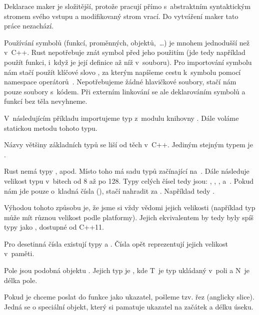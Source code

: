 \documentclass[main.tex]{subfiles}
\begin{document}
Deklarace maker je složitější, protože pracují přímo s~abstraktním syntaktickým stromem
svého vstupu a modifikovaný strom vrací. Do vytváření maker tato práce nezachází.


Používání symbolů (funkcí, proměnných, objektů,~\dots) je mnohem jednodušší než v~C++.
Rust nepotřebuje znát symbol před jeho použitím (jde tedy například použít funkci, i~když
je její definice až níž v~souboru). Pro importování symbolu nám stačí použít klíčové slovo
, za kterým napíšeme cestu k~symbolu pomocí namespace operátorů~\irust{::}.
Nepotřebujeme žádné hlavičkové soubory, stačí nám pouze soubory s~kódem. Při externím
linkování se ale deklarováním symbolů a funkcí bez těla nevyhneme.

V~následujícím příkladu importujeme typ  z~modulu 
knihovny . Dále voláme statickou metodu  tohoto typu.

\obrazek
{}


Názvy většiny základních typů se liší od těch v~C++. Jediným stejným typem je
.


Rust nemá typy ,  apod. Místo toho má sadu typů začínající
na~. Dále následuje velikost typu v~bitech od 8 až po 128. Typy celých čísel tedy
jsou: , , ,  a~. Pokud nám jde
pouze o~kladná čísla (), stačí nahradit  za . Například
tedy .

Výhodou tohoto způsobu je, že jsme si vždy vědomi jejich velikosti (například typ
 může mít různou velikost podle platformy). Jejich ekvivalentem by tedy byly
spíš typy jako , dostupné od C++11.

Pro desetinná čísla existují typy  a . Čísla opět reprezentují
jejich velikost v~paměti.


Pole jsou podobná objektu . Jejich typ je \irust{[T; N]}, kde T~je typ
ukládaný v~poli a N~je délka pole.

Pokud je chceme poslat do funkce jako ukazatel, pošleme tzv. řez (anglicky slice). Jedná
se o speciální objekt, který si pamatuje ukazatel na začátek a délku úseku.
\end{document}
